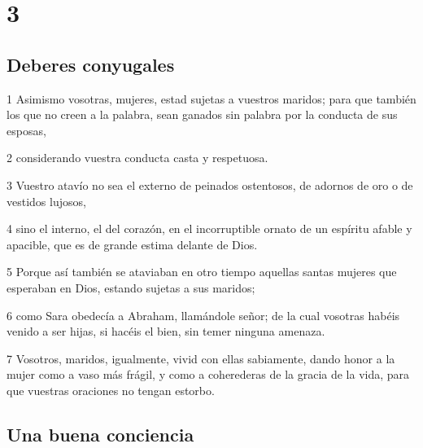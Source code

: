 \chapter{3}

\section*{Deberes conyugales}

\par 1 Asimismo vosotras, mujeres, estad sujetas a vuestros maridos; para que también los que no creen a la palabra, sean ganados sin palabra por la conducta de sus esposas,
\par 2 considerando vuestra conducta casta y respetuosa.
\par 3 Vuestro atavío no sea el externo de peinados ostentosos, de adornos de oro o de vestidos lujosos,
\par 4 sino el interno, el del corazón, en el incorruptible ornato de un espíritu afable y apacible, que es de grande estima delante de Dios.
\par 5 Porque así también se ataviaban en otro tiempo aquellas santas mujeres que esperaban en Dios, estando sujetas a sus maridos;
\par 6 como Sara obedecía a Abraham, llamándole señor; de la cual vosotras habéis venido a ser hijas, si hacéis el bien, sin temer ninguna amenaza.
\par 7 Vosotros, maridos, igualmente, vivid con ellas sabiamente, dando honor a la mujer como a vaso más frágil, y como a coherederas de la gracia de la vida, para que vuestras oraciones no tengan estorbo.

\section*{Una buena conciencia}

